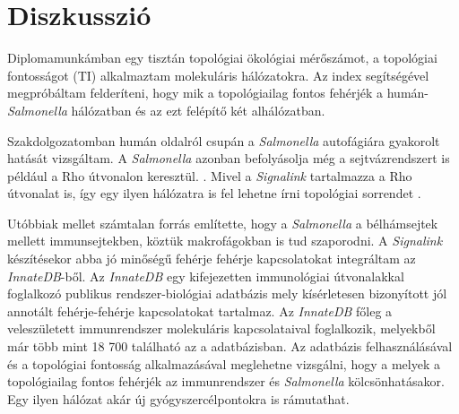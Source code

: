 \documentclass[a4paper,12pt]{article}
\begin{document}
		\pagebreak
	
\section{Diszkusszió}
		Diplomamunkámban egy tisztán topológiai ökológiai mérőszámot, a topológiai fontosságot (TI) alkalmaztam molekuláris hálózatokra. Az index segítségével megpróbáltam felderíteni, hogy mik a topológiailag fontos fehérjék a humán-\textit{Salmonella} hálózatban és az ezt felépítő két alhálózatban. 
		
		Szakdolgozatomban humán oldalról csupán a \textit{Salmonella} autofágiára gyakorolt hatását vizsgáltam. A \textit{Salmonella} azonban befolyásolja még a sejtvázrendszert is például a Rho útvonalon keresztül. \cite{salmonella_and_host_cell_nature} \cite{salmonella_autophagy_nature_old}. Mivel a \textit{Signalink} tartalmazza a Rho útvonalat is, így egy ilyen hálózatra is fel lehetne írni topológiai sorrendet .
		
		Utóbbiak mellet számtalan forrás \cite{salmonella_and_host_cell_nature} \cite{salmonella_autophagy_nature_old} \cite{hilD} említette, hogy a \textit{Salmonella} a bélhámsejtek mellett immunsejtekben, köztük makrofágokban is tud szaporodni. A \textit{Signalink} készítésekor abba jó minőségű fehérje fehérje kapcsolatokat integráltam az \textit{InnateDB}-ből. Az \textit{InnateDB} egy kifejezetten immunológiai útvonalakkal foglalkozó publikus rendszer-biológiai adatbázis mely kísérletesen bizonyított jól annotált fehérje-fehérje kapcsolatokat tartalmaz. Az \textit{InnateDB} főleg a veleszületett immunrendszer molekuláris kapcsolataival foglalkozik, melyekből már több mint 18 700 található az a adatbázisban. \cite{innatedb} Az adatbázis felhasználásával és a topológiai fontosság alkalmazásával meglehetne vizsgálni, hogy a melyek a topológiailag fontos fehérjék az immunrendszer és \textit{Salmonella} kölcsönhatásakor. Egy ilyen hálózat akár új gyógyszercélpontokra is rámutathat.
		
\end{document}
